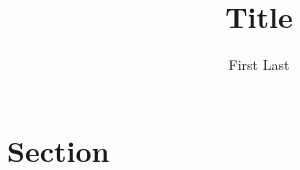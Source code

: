 \documentclass[12pt, a4paper]{article}
\begin{document}
\title{Title}
\author{First Last}
\maketitle

\abstract{}

\section*{Section}

\printbibliography
\end{document}
